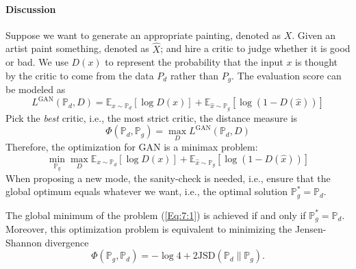 \paragraph{Discussion}
Suppose we want to generate an appropriate painting, denoted as $X$.
Given an artist paint something, denoted as $\hat{X}$;
and hire a critic to judge whether it is good or bad. 
We use $D(x)$ to represent the probability that the input $x$ is thought by the critic to come from the data $P_d$ rather than $P_g$.
The evaluation score can be modeled as
\[
L^{\text{GAN}}(\mathbb{P}_d,D)=
\mathbb{E}_{x\sim \mathbb{P}_d}[\log D(x)]
+
\mathbb{E}_{\hat{x}\sim \mathbb{P}_g}[\log(1-D(\hat{x}))]
\]
Pick the \emph{best} critic, i.e., the most strict critic, the distance measure is 
\[
\Phi(\mathbb{P}_d,\mathbb{P}_g)
=
\max_{D}
L^{\text{GAN}}(\mathbb{P}_d,D)
\]
Therefore, the optimization for GAN is a minimax problem:
\begin{equation}\label{Eq:7:1}
\min_{\mathbb{P}_g}\max_{D}\mathbb{E}_{x\sim \mathbb{P}_d}[\log D(x)]
+
\mathbb{E}_{\hat{x}\sim \mathbb{P}_g}[\log(1-D(\hat{x}))]
\end{equation}
When proposing a new mode, the sanity-check is needed, i.e., 
ensure that the global optimum equals whatever we want, i.e., 
the optimal solution $\mathbb{P}_g^*=\mathbb{P}_d$.
\begin{theorem}
The global minimum of the problem (\ref{Eq:7:1}) is achieved if and only if $\mathbb{P}_g^*=\mathbb{P}_d$. Moreover, this optimization problem is equivalent to minimizing the Jensen-Shannon divergence
\[
\Phi(\mathbb{P}_g,\mathbb{P}_d)
=-\log 4+2\text{JSD}(\mathbb{P}_d\|\mathbb{P}_g).
\]
\end{theorem}
